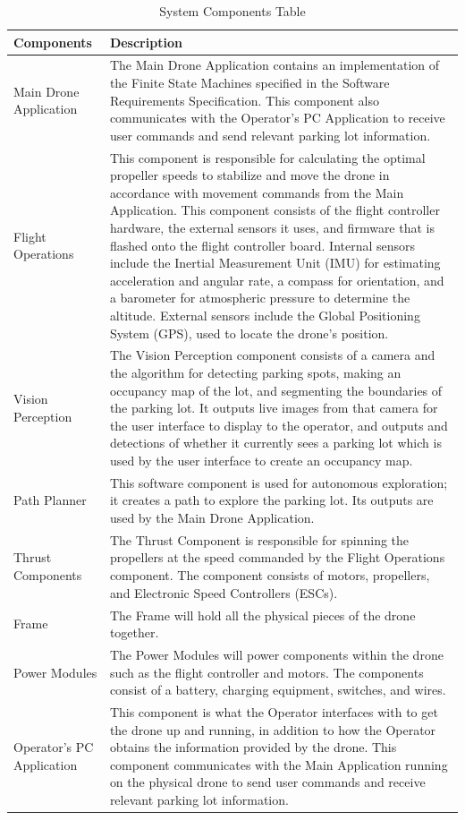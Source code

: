 \documentclass{article}
\begin{document}
\begin{table}[!h]
\begin{center}
\caption {System Components Table} 
\label{tab:SystemComp}
\begin{tabular}{ | m{4 cm} | m{12 cm} | } 
\hline
Components & Description \\
\hline
Main Drone Application & The Main Drone Application contains an implementation of the Finite State Machines specified in the Software Requirements Specification. This component also communicates with the Operator's PC Application to receive user commands and send relevant parking lot information.\\
\hline
Flight Operations & This component is responsible for calculating the optimal propeller speeds to stabilize and move the drone in accordance with movement commands from the Main Application. This component consists of the flight controller hardware, the external sensors it uses, and firmware that is flashed onto the flight controller board. Internal sensors include the Inertial Measurement Unit (IMU) for estimating acceleration and angular rate, a compass for orientation, and a barometer for atmospheric pressure to determine the altitude. External sensors include the Global Positioning System (GPS), used to locate the drone's position. \\
\hline
Vision Perception & The Vision Perception component consists of a camera and the algorithm for detecting parking spots, making an occupancy map of the lot, and segmenting the boundaries of the parking lot. It outputs live images from that camera for the user interface to display to the operator, and outputs and detections of whether it currently sees a parking lot which is used by the user interface to create an occupancy map. \\
\hline
Path Planner & This software component is used for autonomous exploration; it creates a path to explore the parking lot. Its outputs are used by the Main Drone Application. \\
\hline
Thrust Components & The Thrust Component is responsible for spinning the propellers at the speed commanded by the Flight Operations component. The component consists of motors, propellers, and Electronic Speed Controllers (ESCs).\\
\hline
Frame & The Frame will hold all the physical pieces of the drone together.\\
\hline
Power Modules & The Power Modules will power components within the drone such as the flight controller and motors. The components consist of a battery, charging equipment, switches, and wires.\\
\hline
Operator's PC Application & This component is what the Operator interfaces with to get the drone up and running, in addition to how the Operator obtains the information provided by the drone. This component communicates with the Main Application running on the physical drone to send user commands and receive relevant parking lot information. \\
\hline

\end{tabular}
\end{center}
\end{table}
\end{document}
